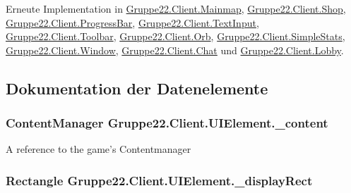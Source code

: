 Erneute Implementation in \hyperlink{class_gruppe22_1_1_client_1_1_mainmap_aae564d34ea6375ae7538699c14006e0a}{Gruppe22.\-Client.\-Mainmap}, \hyperlink{class_gruppe22_1_1_client_1_1_shop_acb19ef7e140c9eb1a873cb0178e7aae3}{Gruppe22.\-Client.\-Shop}, \hyperlink{class_gruppe22_1_1_client_1_1_progress_bar_ac1f470e3a5fa29d2b408e3617e0a5f19}{Gruppe22.\-Client.\-Progress\-Bar}, \hyperlink{class_gruppe22_1_1_client_1_1_text_input_aeb12ff2ec36009368ef79b71eb39fa73}{Gruppe22.\-Client.\-Text\-Input}, \hyperlink{class_gruppe22_1_1_client_1_1_toolbar_a6a41080cfa48a7d381703403590bc019}{Gruppe22.\-Client.\-Toolbar}, \hyperlink{class_gruppe22_1_1_client_1_1_orb_afae90f88a1d08865e47dd12413065fd4}{Gruppe22.\-Client.\-Orb}, \hyperlink{class_gruppe22_1_1_client_1_1_simple_stats_a2caae8c55a4ddde3fd3605d980d6cdaa}{Gruppe22.\-Client.\-Simple\-Stats}, \hyperlink{class_gruppe22_1_1_client_1_1_window_aec6e5dacbb02d585132ee1f799937aaa}{Gruppe22.\-Client.\-Window}, \hyperlink{class_gruppe22_1_1_client_1_1_chat_a505f59e3352f8170506adf261b2c5091}{Gruppe22.\-Client.\-Chat} und \hyperlink{class_gruppe22_1_1_client_1_1_lobby_ae8c225cc62637fcb8edf68005286fed7}{Gruppe22.\-Client.\-Lobby}.



\subsection{Dokumentation der Datenelemente}
\hypertarget{class_gruppe22_1_1_client_1_1_u_i_element_ad9f67f490023c7b1e3760b76c2a4ee6b}{
\subsubsection[{\-\_\-content}]{\setlength{\rightskip}{0pt plus 5cm}Content\-Manager Gruppe22.\-Client.\-U\-I\-Element.\-\_\-content\hspace{0.3cm}{\ttfamily [protected]}}}\label{class_gruppe22_1_1_client_1_1_u_i_element_ad9f67f490023c7b1e3760b76c2a4ee6b}


A reference to the game's Contentmanager 

\hypertarget{class_gruppe22_1_1_client_1_1_u_i_element_a1642baaf247dc3886114f13a000aa8c7}{
\subsubsection[{\-\_\-display\-Rect}]{\setlength{\rightskip}{0pt plus 5cm}Rectangle Gruppe22.\-Client.\-U\-I\-Element.\-\_\-display\-Rect\hspace{0.3cm}{\ttfamily [protected]}}}\label{class_gruppe22_1_1_client_1_1_u_i_element_a1642baaf247dc3886114f13a000aa8c7}


